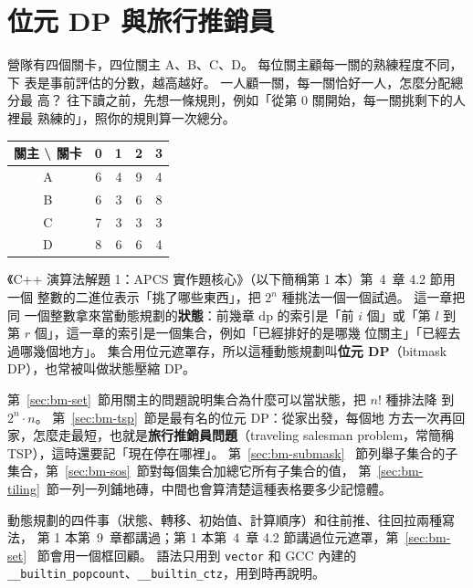 \chapter{位元 DP 與旅行推銷員}
\label{ch:bitmask-dp}


營隊有四個關卡，四位關主 A、B、C、D。 每位關主顧每一關的熟練程度不同，下
表是事前評估的分數，越高越好。 一人顧一關，每一關恰好一人，怎麼分配總分最
高？ 往下讀之前，先想一條規則，例如「從第 $0$ 關開始，每一關挑剩下的人裡最
熟練的」，照你的規則算一次總分。

\begin{center}
\begin{tabular}{c|cccc}
\toprule
關主 \textbackslash{} 關卡 & 0 & 1 & 2 & 3 \\
\midrule
A & 6 & 4 & 9 & 4 \\
B & 6 & 3 & 6 & 8 \\
C & 7 & 3 & 3 & 3 \\
D & 8 & 6 & 6 & 4 \\
\bottomrule
\end{tabular}
\end{center}

《C++ 演算法解題 1：APCS 實作題核心》（以下簡稱第 1 本）第~4~章 4.2 節用一個
整數的二進位表示「挑了哪些東西」，把 $2^n$ 種挑法一個一個試過。 這一章把同
一個整數拿來當動態規劃的\textbf{狀態}：前幾章 $\mathrm{dp}$ 的索引是「前 $i$
個」或「第 $l$ 到第 $r$ 個」，這一章的索引是一個集合，例如「已經排好的是哪幾
位關主」「已經去過哪幾個地方」。 集合用位元遮罩存，所以這種動態規劃叫\textbf{位元
DP}（bitmask DP），也常被叫做狀態壓縮 DP。

第~\ref{sec:bm-set}~節用關主的問題說明集合為什麼可以當狀態，把 $n!$ 種排法降
到 $2^n \cdot n$。 第~\ref{sec:bm-tsp}~節是最有名的位元 DP：從家出發，每個地
方去一次再回家，怎麼走最短，也就是\textbf{旅行推銷員問題}（traveling salesman
problem，常簡稱 TSP），這時還要記「現在停在哪裡」。 第~\ref{sec:bm-submask}
~節列舉子集合的子集合，第~\ref{sec:bm-sos}~節對每個集合加總它所有子集合的值，
第~\ref{sec:bm-tiling}~節一列一列鋪地磚，中間也會算清楚這種表格要多少記憶體。

動態規劃的四件事（狀態、轉移、初始值、計算順序）和往前推、往回拉兩種寫法，
第 1 本第~9~章都講過；第 1 本第~4~章 4.2 節講過位元遮罩，第~\ref{sec:bm-set}
~節會用一個框回顧。 語法只用到 \texttt{vector} 和 GCC 內建的
\texttt{\_\_builtin\_popcount}、\texttt{\_\_builtin\_ctz}，用到時再說明。

